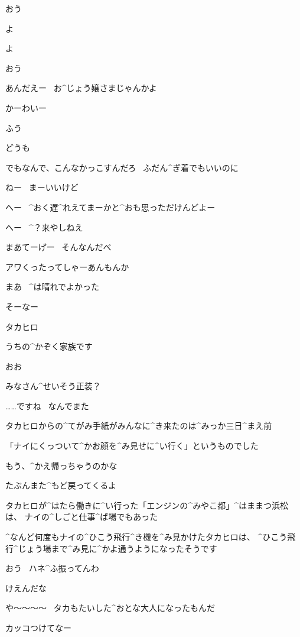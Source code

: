 \page[47]
\Ojisan おう

\Makki よ

\Alpha よ

\page
\Ojisan おう

\Ojisan あんだえー
\ お^{じょう}{嬢}さまじゃんかよ

\Alpha かーわいー

\Makki ふう

\Makki どうも

\Makki でもなんで、こんなかっこすんだろ
\ ふだん^{ぎ}{着}でもいいのに

\Alpha ねー
\ まーいいけど

\page
\Ojisan へー
\ ^{おく}{遅}^{れ}{え}てまーかと^{おも}{思}っただけんどよー

\Ojisan へー
\ ^{？}{来}やしねえ

\Person まあてーげー
\ そんなんだべ

\Person  アワくったってしゃーあんもんか

\Person まあ
\ ^{は}{晴}れでよかった

\Person そーなー

\page[53]
\Makki タカヒロ

\Takahiro うちの^{かぞく}{家族}です

\Nai おお

\Nai みなさん^{せいそう}{正装}？

\Takahiro ……ですね
\ なんでまた

\page
\Alpha タカヒロからの^{てがみ}{手紙}がみんなに^{き}{来}たのは^{みっか}{三日}^{まえ}{前}

\Alpha 「ナイにくっついて^{かお}{顔}を^{み}{見}せに^{い}{行}く」というものでした

\Makki もう、^{かえ}{帰}っちゃうのかな

\Alpha たぶんまた^{もど}{戻}ってくるよ

\Alpha タカヒロが^{はたら}{働}きに^{い}{行}った「エンジンの^{みやこ}{都}」^{はままつ}{浜松}は、
ナイの^{しごと}{仕事}^{ば}{場}でもあった

\Alpha ^{なんど}{何度}もナイの^{ひこう}{飛行}^{き}{機}を^{み}{見}かけたタカヒロは、
^{ひこう}{飛行}^{じょう}{場}まで^{み}{見}に^{かよ}{通}うようになったそうです

\page[56]
\Ojisan おう
\ ハネ^{ふ}{振}ってんわ

\Person けえんだな

\page
\Person や〜〜〜〜
\ タカもたいした^{おとな}{大人}になったもんだ

\Ojisan カッコつけてなー


